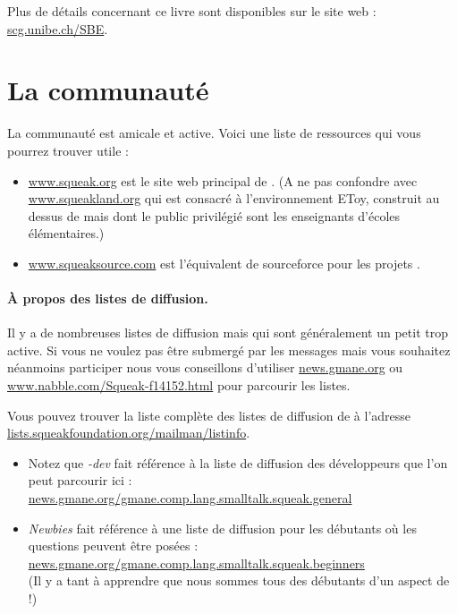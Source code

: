 \documentclass[a4paper,10pt,twoside]{book}
\begin{document}
Plus de d\'etails concernant ce livre sont disponibles sur le site web : 
\url{scg.unibe.ch/SBE}.

\section*{La communaut\'e \sq}

La communaut\'e \sq est amicale et active.
Voici une liste de ressources qui vous pourrez trouver utile :

\begin{itemize}
\item \url{www.squeak.org} est le site web principal de \sq. (A ne pas confondre avec  \url{www.squeakland.org} qui est consacr\'e \`a l'environnement EToy, construit au dessus de \sq mais dont le public privil\'egi\'e sont les enseignants d'\'ecoles \'el\'ementaires.)

\item \url{www.squeaksource.com} est l'\'equivalent de sourceforce pour les projets \sq.
\end{itemize}

\paragraph{\`A propos des listes de diffusion.} Il y a de nombreuses listes de diffusion mais qui sont g\'en\'eralement un petit trop active. Si vous ne voulez pas \^etre submerg\'e par les messages mais vous souhaitez n\'eanmoins participer nous vous conseillons d'utiliser \url{news.gmane.org} ou \url{www.nabble.com/Squeak-f14152.html} pour parcourir les listes.

Vous pouvez trouver la liste compl\`ete des listes de diffusion de \sq \`a l'adresse \url{lists.squeakfoundation.org/mailman/listinfo}.

\begin{itemize}
\item Notez que \emph{\sq-dev} fait r\'ef\'erence \`a la liste de diffusion des d\'eveloppeurs  que l'on peut parcourir ici :\\
\url{news.gmane.org/gmane.comp.lang.smalltalk.squeak.general}
\item \emph{Newbies} fait r\'ef\'erence \`a une liste de diffusion pour les d\'ebutants o\`u les questions peuvent \^etre pos\'ees :\\
\url{news.gmane.org/gmane.comp.lang.smalltalk.squeak.beginners}\\
(Il y a tant \`a apprendre que nous sommes tous des d\'ebutants d'un aspect de \sq!)
\end{itemize}
\end{document}
